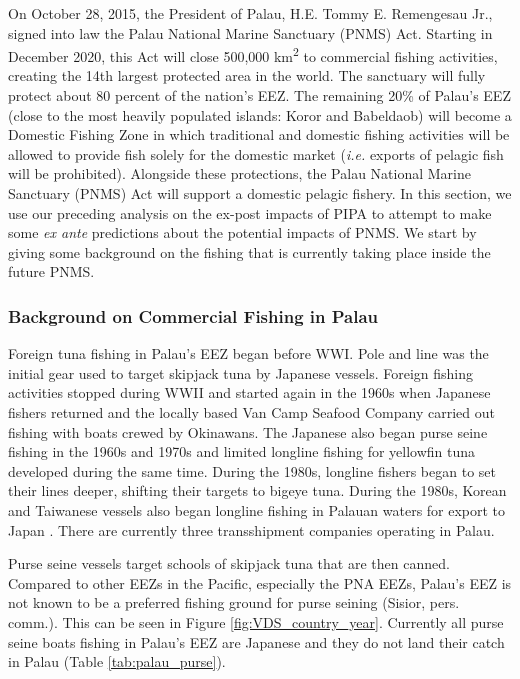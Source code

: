 \documentclass[9p,twocolumn,twoside,lineno]{pnas-new}
\begin{document}
On October 28, 2015, the President of Palau, H.E. Tommy E. Remengesau Jr., signed into law the Palau National Marine Sanctuary (PNMS) Act. Starting in December 2020, this Act will close 500,000 km\textsuperscript{2} to commercial fishing activities, creating the 14th largest protected area in the world. The sanctuary will fully protect about 80 percent of the nation’s EEZ. The remaining 20\% of Palau’s EEZ (close to the most heavily populated islands: Koror and Babeldaob) will become a Domestic Fishing Zone in which traditional and domestic fishing activities will be allowed to provide fish solely for the domestic market (\emph{i.e.} exports of pelagic fish will be prohibited). Alongside these protections, the Palau National Marine Sanctuary (PNMS) Act will support a domestic pelagic fishery. In this section, we use our preceding analysis on the ex-post impacts of PIPA to attempt to make some \emph{ex ante} predictions about the potential impacts of PNMS. We start by giving some background on the fishing that is currently taking place inside the future PNMS. 

\subsubsection{Background on Commercial Fishing in Palau}

Foreign tuna fishing in Palau’s EEZ began before WWI. Pole and line was the initial gear used to target skipjack tuna by Japanese vessels. Foreign fishing activities stopped during WWII and started again in the 1960s when Japanese fishers returned and the locally based Van Camp Seafood Company carried out fishing with boats crewed by Okinawans. The Japanese also began purse seine fishing in the 1960s and 1970s and limited longline fishing for yellowfin tuna developed during the same time. During the 1980s, longline fishers began to set their lines deeper, shifting their targets to bigeye tuna. During the 1980s, Korean and Taiwanese vessels also began longline fishing in Palauan waters for export to Japan \citep{chapman2000development}. There are currently three transshipment companies operating in Palau.

Purse seine vessels target schools of skipjack tuna that are then canned. Compared to other EEZs in the Pacific, especially the PNA EEZs, Palau’s EEZ is not known to be a preferred fishing ground for purse seining (Sisior, pers. comm.). This can be seen in Figure \ref{fig:VDS_country_year}. Currently all purse seine boats fishing in Palau’s EEZ are Japanese and they do not land their catch in Palau (Table \ref{tab:palau_purse}). 
\end{document}

